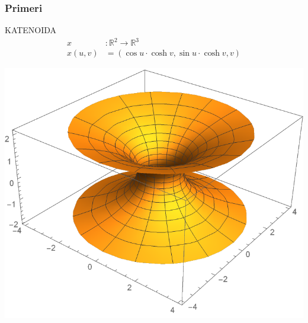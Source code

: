 \documentclass[9pt, table]{beamer}
\newcommand{\R}{\mathbb R}
\begin{document}

\begin{frame}
\frametitle{Primeri}

KATENOIDA
\begin{align*}
x &\colon \R^{2} \to \R^{3} \\
x(u,v) &= (\cos u \cdot \cosh v, \sin u \cdot \cosh v, v)
\end{align*}
%
\begin{center}
\includegraphics[scale=0.5]{catenoid.pdf}
\end{center}

\end{frame}

\end{document}
